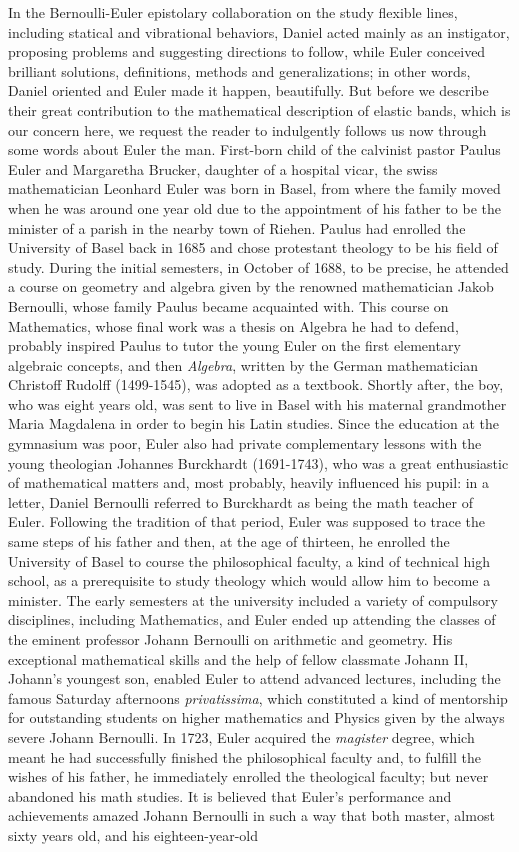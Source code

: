 In the Bernoulli-Euler epistolary collaboration on the study flexible lines, including statical and vibrational behaviors, Daniel acted mainly as an instigator, proposing problems and suggesting directions to follow, while Euler conceived brilliant solutions, definitions, methods and generalizations; in other words, Daniel oriented and Euler made it happen, beautifully. But before we describe their great contribution to the mathematical description of elastic bands, which is our concern here, we request the reader to indulgently follows us now through some words about Euler the man. First-born child of the calvinist pastor Paulus Euler and Margaretha Brucker, daughter of a hospital vicar, the swiss mathematician Leonhard Euler was born in Basel, from where the family moved when he was around one year old due to the appointment of his father to be the minister of a parish in the nearby town of Riehen. Paulus had enrolled the University of Basel back in 1685 and chose protestant theology to be his field of study. During the initial semesters, in October of 1688, to be precise, he attended a course on geometry and algebra given by the renowned mathematician Jakob Bernoulli, whose family Paulus became acquainted with. This course on Mathematics, whose final work was a thesis on Algebra he had to defend, probably inspired Paulus to tutor the young Euler on the first elementary algebraic concepts, and then \emph{Algebra}, written by the German mathematician Christoff Rudolff (1499-1545), was adopted as a textbook. Shortly after, the boy, who was eight years old, was sent to live in Basel with his maternal grandmother Maria Magdalena in order to begin his Latin studies. Since the education at the gymnasium was poor, Euler also had private complementary lessons with the young theologian Johannes Burckhardt (1691-1743), who was a great enthusiastic of mathematical matters and, most probably, heavily influenced his pupil: in a letter, Daniel Bernoulli referred to Burckhardt as being the math teacher of Euler. Following the tradition of that period, Euler was supposed to trace the same steps of his father and then, at the age of thirteen, he enrolled the University of Basel to course the philosophical faculty, a kind of technical high school, as a prerequisite to study theology which would allow him to become a minister. The early semesters at the university included a variety of compulsory disciplines, including Mathematics, and Euler ended up attending the classes of the eminent professor Johann Bernoulli on arithmetic and geometry. His exceptional mathematical skills and the help of fellow classmate Johann II, Johann's youngest son, enabled Euler to attend advanced lectures, including the famous Saturday afternoons \emph{privatissima}, which constituted a kind of mentorship for outstanding students on higher mathematics and Physics given by the always severe Johann Bernoulli. In 1723, Euler acquired the \emph{magister} degree, which meant he had successfully finished the philosophical faculty and, to fulfill the wishes of his father, he immediately enrolled the theological faculty; but never abandoned his math studies. It is believed that Euler's performance and achievements amazed Johann Bernoulli in such a way that both master, almost sixty years old, and his eighteen-year-old 